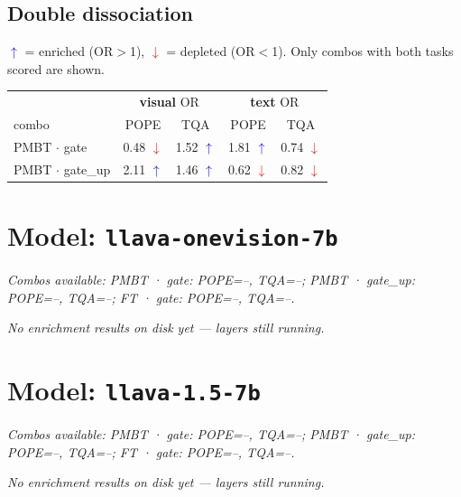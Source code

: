 \documentclass[11pt,a4paper]{article}
\newcommand{\up}{\textcolor{blue}{$\uparrow$}}
\newcommand{\dn}{\textcolor{red}{$\downarrow$}}
\begin{document}
\subsection{Double dissociation}
\up{} = enriched (OR$>$1), \dn{} = depleted (OR$<$1). Only combos with both tasks scored are shown.
\begin{center}
\begin{tabular}{l cc cc}
\toprule
 & \multicolumn{2}{c}{\textbf{visual} OR} & \multicolumn{2}{c}{\textbf{text} OR} \\
combo & POPE & TQA & POPE & TQA \\
\midrule
PMBT $\cdot$ gate & 0.48 \dn & 1.52 \up & 1.81 \up & 0.74 \dn \\
PMBT $\cdot$ gate\_up & 2.11 \up & 1.46 \up & 0.62 \dn & 0.82 \dn \\
\bottomrule
\end{tabular}
\end{center}
\section{Model: \texttt{llava-onevision-7b}}
\emph{Combos available: PMBT · gate: POPE=--, TQA=--; PMBT · gate\_up: POPE=--, TQA=--; FT · gate: POPE=--, TQA=--.}

\emph{No enrichment results on disk yet --- layers still running.}
\section{Model: \texttt{llava-1.5-7b}}
\emph{Combos available: PMBT · gate: POPE=--, TQA=--; PMBT · gate\_up: POPE=--, TQA=--; FT · gate: POPE=--, TQA=--.}

\emph{No enrichment results on disk yet --- layers still running.}
\end{document}
